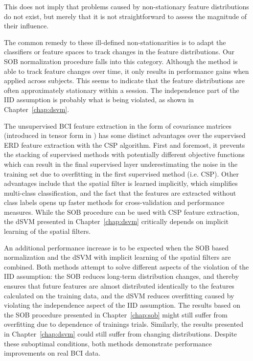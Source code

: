 This does not imply that problems caused by non-stationary feature
distributions do not exist, but merely that it is not straightforward to
assess the magnitude of their influence.

The common remedy to these ill-defined non-stationarities is to adapt the
classifiers or feature spaces to track changes in the feature distributions.
Our \ac{SOB} normalization procedure falls into this category. Although the
method is able to track feature changes over time, it only results in
performance gains when applied across subjects. This seems to indicate that the
feature distributions are often approximately stationary within a session. The
independence part of the \ac{IID} assumption is probably what is being
violated, as shown in Chapter~\ref{chap:dsvm}.

The unsupervised \ac{BCI} feature extraction in the form of covariance matrices
(introduced in tensor form in \cite{farquhar2009lfs}) has some distinct
advantages over the supervised \ac{ERD} feature extraction with the \ac{CSP}
algorithm. First and foremost, it prevents the stacking of supervised methods
with potentially different objective functions which can result in the final
supervised layer underestimating the noise in the training set due to
overfitting in the first supervised method (i.e. \ac{CSP}). Other advantages
include that the spatial filter is learned implicitly, which simplifies
multi-class classification, and the fact that the features are extracted
without class labels opens up faster methods for cross-validation and
performance measures. 
%
While the \ac{SOB} procedure can be used with \ac{CSP} feature extraction, the
\ac{dSVM} presented in Chapter~\ref{chap:dsvm} critically depends on implicit
learning of the spatial filters. 

An additional performance increase is to be expected when the \ac{SOB} based
normalization and the \ac{dSVM} with implicit learning of the spatial filters
are combined. Both methods attempt to solve different aspects of the violation
of the \ac{IID} assumption: the \ac{SOB} reduces long-term distribution
changes, and thereby ensures that future features are almost distributed
identically to the features calculated on the training data, and the \ac{dSVM}
reduces overfitting caused by violating the independence aspect of the
\ac{IID} assumption.
%
The results based on the \ac{SOB} procedure presented in Chapter~\ref{chap:sob}
might still suffer from overfitting due to dependence of trainings trials.
Similarly, the results presented in Chapter~\ref{chap:dsvm} could still suffer
from changing distributions. Despite these suboptimal conditions, both methods
demonstrate performance improvements on real \ac{BCI} data.

